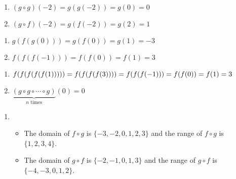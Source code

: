 \begin{multicols}{2}
\begin{enumerate}
\setcounter{enumi}{\value{HW}}

\item $(g \circ g)(-2) = g(g(-2)) = g(0) = 0$
\item $(g \circ f)(-2) = g(f(-2)) = g(2) = 1$

\setcounter{HW}{\value{enumi}}
\end{enumerate}
\end{multicols}

\begin{multicols}{2}
\begin{enumerate}
\setcounter{enumi}{\value{HW}}

\item $g(f(g(0))) = g(f(0)) = g(1) = -3$
\item $f(f(f(-1))) = f(f(0)) = f(1) = 3$

\setcounter{HW}{\value{enumi}}
\end{enumerate}
\end{multicols}

\begin{multicols}{2}
\begin{enumerate}
\setcounter{enumi}{\value{HW}}

\item $f(f(f(f(f(1))))) = f(f(f(f(3)))) =\\ f(f(f(-1))) = f(f(0))  = f(1) = 3$
\item $\underbrace{(g \circ g \circ \cdots \circ g)}_{\mbox{$n$ times}}(0) = 0$

\setcounter{HW}{\value{enumi}}
\end{enumerate}
\end{multicols}

\begin{enumerate}
\setcounter{enumi}{\value{HW}}

\item  \begin{itemize}  \item  The domain of $f \circ g$ is $\{ -3, -2, 0, 1, 2, 3\}$ and the range of $f \circ g$ is $\{1, 2, 3, 4\}$.
\item The domain of $g \circ f$ is $\{ -2, -1, 0, 1, 3 \}$ and the range of $g \circ f$ is $\{ -4, -3, 0, 1, 2 \}$.

\end{itemize}

\setcounter{HW}{\value{enumi}}
\end{enumerate}


